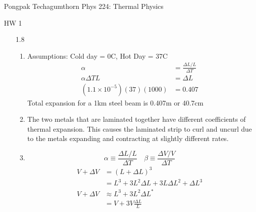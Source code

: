 \documentclass{article}
\begin{document}
\large
{\Large Pongpak Techagumthorn
\hfill Phys 224: Thermal Physics}
\begin{center}
    {\Large
        HW 1
    }
    \end{center}
\vspace{0.1in}
\begin{enumerate}
    \item [1.8]
    \begin{enumerate}
        \item Assumptions: Cold day = 0\degree C, Hot Day = 37\degree C
            \begin{align*}
                \alpha &= \frac{\Delta L / L}{\Delta T} \\
                \alpha \Delta T L &= \Delta L \\
                (1.1 \times 10^{-5})(37)(1000) &= 0.407
            \end{align*}
            Total expansion for a 1km steel beam is 0.407m or 40.7cm
        \vspace{0.05in}
        \item The two metals that are laminated together have different coefficients of thermal expansion. This causes the laminated strip to curl and uncurl due to the metals expanding and contracting at slightly different rates.
        \vspace{0.05in}
        \item
            \begin{equation*}
                \alpha \equiv \frac{\Delta L / L}{\Delta T} \quad \beta \equiv \frac{\Delta V / V}{\Delta T}
            \end{equation*}
            \begin{align*}
                V + \Delta V &= (L + \Delta L)^3 \\
                &= L^3 + 3L^2 \Delta L + 3L {\Delta L}^2 + {\Delta L}^3 \\
                V + \Delta V & \approx L^3 + 3L^2 \Delta L^{\ast} \\
                &= V + 3V \frac{\Delta L}{L}\\

\end{align*}
\end{enumerate}
\end{enumerate}
\end{document}

